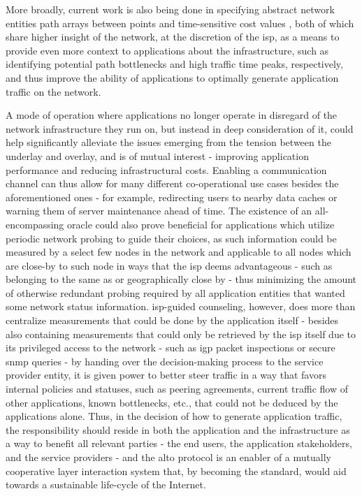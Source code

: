         More broadly, current work is also being done in specifying abstract network entities path arrays between points \cite{alto-path-vector} and time-sensitive cost values \cite{alto-calendar-cost-map}, both of which share higher insight of the network, at the discretion of the \gls{isp}, as a means to provide even more context to applications about the infrastructure, such as identifying potential path bottlenecks and high traffic time peaks, respectively, and thus improve the ability of applications to optimally generate application traffic on the network.

    A mode of operation where applications no longer operate in disregard of the network infrastructure they run on, but instead in deep consideration of it, could help significantly alleviate the issues emerging from the tension between the underlay and overlay, and is of mutual interest - improving application performance and reducing infrastructural costs.
    Enabling a communication channel can thus allow for many different co-operational use cases besides the aforementioned ones - for example, redirecting users to nearby data caches or warning them of server maintenance ahead of time.
    The existence of an all-encompassing oracle could also prove beneficial for applications which utilize periodic network probing to guide their choices, as such information could be measured by a select few nodes in the network and applicable to all nodes which are close-by to such node in ways that the \gls{isp} deems advantageous - such as belonging to the same \gls{as} or geographically close by - thus minimizing the amount of otherwise redundant probing required by all application entities that wanted some network status information.
    \gls{isp}-guided counseling, however, does more than centralize measurements that could be done by the application itself - besides also containing measurements that could only be retrieved by the \gls{isp} itself due to its privileged access to the network - such as \gls{igp} packet inspections or secure \gls{snmp} queries - by handing over the decision-making process to the service provider entity, it is given power to better steer traffic in a way that favors internal policies and statuses, such as peering agreements, current traffic flow of other applications, known bottlenecks, etc., that could not be deduced by the applications alone.
    Thus, in the decision of how to generate application traffic, the responsibility should reside in both the application and the infrastructure as a way to benefit all relevant parties - the end users, the application stakeholders, and the service providers - and the \gls{alto} protocol is an enabler of a mutually cooperative layer interaction system that, by becoming the standard, would aid towards a sustainable life-cycle of the Internet.

